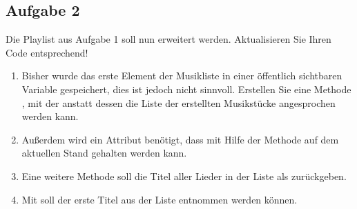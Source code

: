 \documentclass{lehramt-informatik-aufgabe}
\begin{document}
\subsection{Aufgabe 2}

Die Playlist aus Aufgabe 1 soll nun erweitert werden. Aktualisieren Sie
Ihren Code entsprechend!

\begin{enumerate}

%

\item Bisher wurde das erste Element der Musikliste in einer öffentlich
sichtbaren Variable gespeichert, dies ist jedoch nicht sinnvoll.
Erstellen Sie eine Methode , mit der anstatt dessen
die Liste der erstellten Musikstücke angesprochen werden kann.

\begin{liAntwort}
\end{liAntwort}

%

\item Außerdem wird ein Attribut  benötigt, dass mit Hilfe
der Methode  auf dem aktuellen Stand
gehalten werden kann.

\begin{liAntwort}
\end{liAntwort}

%

\item Eine weitere Methode  soll die Titel
aller Lieder in der Liste als  zurückgeben.

\begin{liAntwort}
\end{liAntwort}

%

\item Mit  soll der erste Titel aus der Liste
entnommen werden können.

\begin{liAntwort}
\end{liAntwort}


\end{enumerate}
\end{document}
